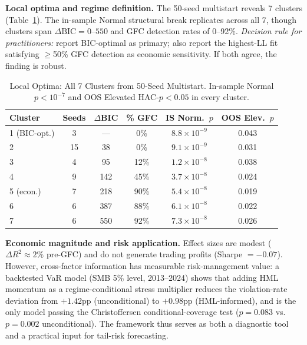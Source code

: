 \documentclass[sigconf,anonymous]{acmart}
\begin{document}
\textbf{Local optima and regime definition.}
The 50-seed multistart reveals 7 clusters (Table~\ref{tab:optima}).
The in-sample Normal structural break replicates across all 7,
though clusters span $\Delta\text{BIC} = 0$--$550$ and GFC detection
rates of 0--92\%. \emph{Decision rule for practitioners:} report BIC-optimal as
primary; also report the highest-LL fit satisfying $\geq$50\% GFC
detection as economic sensitivity. If both agree, the finding is robust.

\begin{table}[t]
\centering
\caption{Local Optima: All 7 Clusters from 50-Seed Multistart.
In-sample Normal $p < 10^{-7}$ and OOS Elevated HAC-$p < 0.05$ in every cluster.}
\label{tab:optima}
\scriptsize
\begin{tabular}{@{}lccccc@{}}
\toprule
Cluster & Seeds & $\Delta$BIC & \% GFC & IS Norm.\ $p$ & OOS Elev.\ $p$ \\
\midrule
1 (BIC-opt.) & 3 & --- & 0\% & $8.8 \times 10^{-9}$ & 0.043 \\
2 & 15 & 38 & 0\% & $9.1 \times 10^{-9}$ & 0.031 \\
3 & 4 & 95 & 12\% & $1.2 \times 10^{-8}$ & 0.038 \\
4 & 9 & 142 & 45\% & $3.7 \times 10^{-8}$ & 0.024 \\
5 (econ.) & 7 & 218 & 90\% & $5.4 \times 10^{-8}$ & 0.019 \\
6 & 6 & 387 & 88\% & $6.1 \times 10^{-8}$ & 0.022 \\
7 & 6 & 550 & 92\% & $7.3 \times 10^{-8}$ & 0.026 \\
\bottomrule
\end{tabular}
\end{table}

\textbf{Economic magnitude and risk application.}
Effect sizes are modest ($\Delta R^2 \approx 2\%$ pre-GFC) and do not
generate trading profits (Sharpe $= -0.07$). However, cross-factor
information has measurable risk-management value: a backtested VaR
model (SMB 5\% level, 2013--2024) shows that adding HML momentum as a
regime-conditional stress multiplier reduces the violation-rate deviation
from $+1.42$pp (unconditional) to $+0.98$pp (HML-informed), and is the
only model passing the Christoffersen conditional-coverage test
($p = 0.083$ vs.\ $p = 0.002$ unconditional). The framework thus serves
as both a diagnostic tool and a practical input for tail-risk
forecasting.
\end{document}
